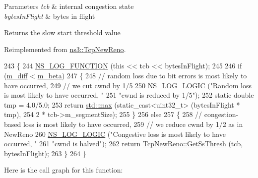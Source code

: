 \begin{DoxyParams}{Parameters}
{\em tcb} & internal congestion state \\
\hline
{\em bytes\+In\+Flight} & bytes in flight\\
\hline
\end{DoxyParams}
\begin{DoxyReturn}{Returns}
the slow start threshold value 
\end{DoxyReturn}


Reimplemented from \hyperlink{classns3_1_1TcpNewReno_a1cb467aaa4960dfe10b963ed9f3d5aa2}{ns3\+::\+Tcp\+New\+Reno}.


\begin{DoxyCode}
243 \{
244   \hyperlink{log-macros-disabled_8h_a90b90d5bad1f39cb1b64923ea94c0761}{NS\_LOG\_FUNCTION} (\textcolor{keyword}{this} << tcb << bytesInFlight);
245 
246   \textcolor{keywordflow}{if} (\hyperlink{classns3_1_1TcpVeno_ae98841fe53c815c3d754675d2857ac80}{m\_diff} < \hyperlink{classns3_1_1TcpVeno_ad041620f3dc6988923c412d8a4183f36}{m\_beta})
247     \{
248       \textcolor{comment}{// random loss due to bit errors is most likely to have occurred,}
249       \textcolor{comment}{// we cut cwnd by 1/5}
250       \hyperlink{group__logging_ga88acd260151caf2db9c0fc84997f45ce}{NS\_LOG\_LOGIC} (\textcolor{stringliteral}{"Random loss is most likely to have occurred, "}
251                     \textcolor{stringliteral}{"cwnd is reduced by 1/5"});
252       \textcolor{keyword}{static} \textcolor{keywordtype}{double} tmp = 4.0/5.0;
253       \textcolor{keywordflow}{return} \hyperlink{80211b_8c_affe776513b24d84b39af8ab0930fef7f}{std::max} (static\_cast<uint32\_t> (bytesInFlight * tmp),
254                        2 * tcb->m\_segmentSize);
255     \}
256   \textcolor{keywordflow}{else}
257     \{
258       \textcolor{comment}{// congestion-based loss is most likely to have occurred,}
259       \textcolor{comment}{// we reduce cwnd by 1/2 as in NewReno}
260       \hyperlink{group__logging_ga88acd260151caf2db9c0fc84997f45ce}{NS\_LOG\_LOGIC} (\textcolor{stringliteral}{"Congestive loss is most likely to have occurred, "}
261                     \textcolor{stringliteral}{"cwnd is halved"});
262       \textcolor{keywordflow}{return} \hyperlink{classns3_1_1TcpNewReno_a1cb467aaa4960dfe10b963ed9f3d5aa2}{TcpNewReno::GetSsThresh} (tcb, bytesInFlight);
263     \}
264 \}
\end{DoxyCode}


Here is the call graph for this function\+:




